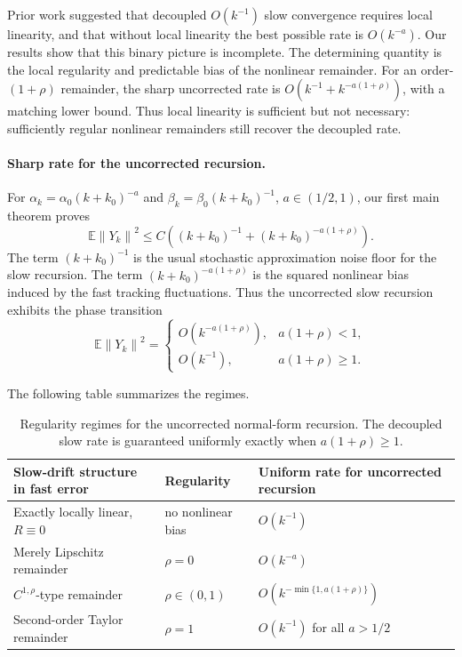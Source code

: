 \documentclass{article}
\newcommand{\E}{\mathbb{E}}
\newcommand{\norm}[1]{\left\lVert #1\right\rVert}
\begin{document}





Prior work \cite{chandak20261,han2024} suggested that decoupled $O(k^{-1})$ slow convergence requires local linearity, and that without local linearity the best possible rate is $O(k^{-a})$. Our results show that this binary picture is incomplete. The determining quantity is the local regularity and predictable bias of the nonlinear remainder. For an order-$(1+\rho)$ remainder, the sharp uncorrected rate is $O(k^{-1} + k^{-a(1+\rho)})$, with a matching lower bound. Thus local linearity is sufficient but not necessary: sufficiently regular nonlinear remainders still recover the decoupled rate.

\paragraph{Sharp rate for the uncorrected recursion.}
For $\alpha_k=\alpha_0(k+k_0)^{-a}$ and $\beta_k=\beta_0(k+k_0)^{-1}$, $a\in(1/2,1)$, our first main theorem proves
\begin{equation}
  \E\norm{Y_k}^2 \le C\left((k+k_0)^{-1}+(k+k_0)^{-a(1+\rho)}\right). \label{eq:intro-rate}
\end{equation}
The term $(k+k_0)^{-1}$ is the usual stochastic approximation noise floor for the slow recursion. The term $(k+k_0)^{-a(1+\rho)}$ is the squared nonlinear bias induced by the fast tracking fluctuations. Thus the uncorrected slow recursion exhibits the phase transition
\[
  \E\norm{Y_k}^2 =
  \begin{cases}
    O(k^{-a(1+\rho)}), & a(1+\rho)<1,\\
    O(k^{-1}), & a(1+\rho)\ge 1.
  \end{cases}
\]

The following table summarizes the regimes.
\begin{table}[h]
\centering
\begin{tabular}{lll}
\toprule
Slow-drift structure in fast error & Regularity & Uniform rate for uncorrected recursion \\
\midrule
Exactly locally linear, $R\equiv0$ & no nonlinear bias & $O(k^{-1})$ \\
Merely Lipschitz remainder & $\rho=0$ & $O(k^{-a})$ \\
$C^{1,\rho}$-type remainder & $\rho\in(0,1)$ & $O(k^{-\min\{1,a(1+\rho)\}})$ \\
Second-order Taylor remainder & $\rho=1$ & $O(k^{-1})$ for all $a>1/2$ \\
\bottomrule
\end{tabular}
\caption{Regularity regimes for the uncorrected normal-form recursion. The decoupled slow rate is guaranteed uniformly exactly when $a(1+\rho)\ge1$.}
\label{tab:regularity-regimes}
\end{table}
\end{document}
